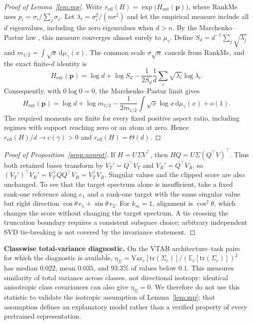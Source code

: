 \documentclass{article}
\newcommand{\reff}{\ensuremath{r_{\mathrm{eff}}}\xspace}
\begin{document}
\begin{proof}[Proof of Lemma~\ref{lem:mp}]
Write $\reff(H)=\exp\!\bigl(H_{\mathrm{ent}}(\mathbf p)\bigr)$, where RankMe uses $p_i=\sigma_i/\sum_j\sigma_j$.  Let $\lambda_i=\sigma_i^2/(n\sigma^2)$ and let the empirical measure include all $d$ eigenvalues, including the zero eigenvalues when $d>n$.  By the Marchenko--Pastur law \citep{marchenko1967distribution}, this measure converges almost surely to $\mu_\gamma$.  Define $S_d=d^{-1}\sum_j\sqrt{\lambda_j}$ and $m_{1/2}=\int\sqrt{x}\,\mathrm d\mu_\gamma(x)$.  The common scale $\sigma\sqrt n$ cancels from RankMe, and the exact finite-$d$ identity is
\[
H_{\mathrm{ent}}(\mathbf p)
=\log d+\log S_d
-\frac{1}{2S_d}\frac{1}{d}\sum_i\sqrt{\lambda_i}\log\lambda_i.
\]
Consequently, with $0\log0=0$, the Marchenko--Pastur limit gives
\[
H_{\mathrm{ent}}(\mathbf p)
=\log d+\log m_{1/2}
-\frac{1}{2m_{1/2}}\int\sqrt{x}\log x\,\mathrm d\mu_\gamma(x)+o(1).
\]
The required moments are finite for every fixed positive aspect ratio, including regimes with support reaching zero or an atom at zero.  Hence $\reff(H)/d\to c(\gamma)>0$ and $\reff(H)=\Theta(d)$.
\end{proof}

\begin{proof}[Proof of Proposition~\ref{prop:nonrot}]
If $H=U\Sigma V^\top$, then $HQ=U\Sigma(Q^\top V)^\top$. Thus both retained bases transform by $V_T'=Q^\top V_T$ and $V_R'=Q^\top V_R$, so $(V_T')^\top V_R'=V_T^\top QQ^\top V_R=V_T^\top V_R$. Singular values and the clipped score are also unchanged. To see that the target spectrum alone is insufficient, take a fixed rank-one reference along $e_1$ and a rank-one target with the same singular value but right direction $\cos\theta\,e_1+\sin\theta\,e_2$. For $k_m=1$, alignment is $\cos^2\theta$, which changes the score without changing the target spectrum. A tie crossing the truncation boundary requires a consistent subspace choice; arbitrary independent SVD tie-breaking is not covered by the invariance statement.
\end{proof}

\textbf{Classwise total-variance diagnostic.} On the VTAB architecture--task pairs for which the diagnostic is available, $\eta_\Sigma = \mathrm{Var}_c[\mathrm{tr}(\Sigma_c)]/(\mathbb{E}_c[\mathrm{tr}(\Sigma_c)])^2$ has median $0.022$, mean $0.035$, and $93.3\%$ of values below $0.1$. This measures similarity of total variance across classes, not directional isotropy: identical anisotropic class covariances can also give $\eta_\Sigma=0$. We therefore do not use this statistic to validate the isotropic assumption of Lemma~\ref{lem:mp}; that assumption defines an explanatory model rather than a verified property of every pretrained representation.
\end{document}
